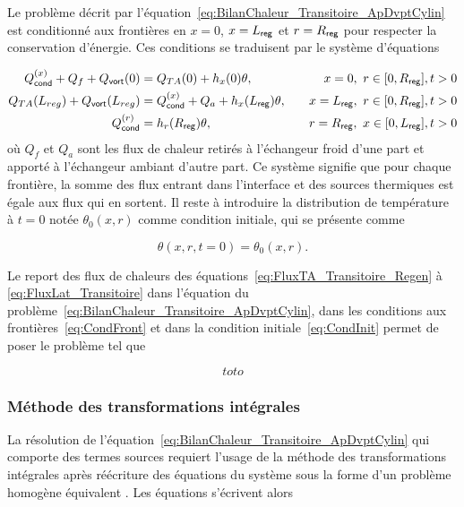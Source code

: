 Le problème décrit par l'équation~\ref{eq:BilanChaleur_Transitoire_ApDvptCylin} est conditionné aux frontières en $x=0$, $x=L_{\sf reg}$ et $r=R_{\sf reg}$ pour respecter la conservation d'énergie. Ces conditions se traduisent par le système d'équations

\begin{subequations}
	\begin{align}
		Q_{\sf cond}^{(x)} + Q_f + Q_{\sf vort}(0) &= Q_{TA}(0) + h_x(0)\theta,\quad &x=0,\ r \in [0,R_{\sf reg}], t>0 \label{eq:CondFront_x_0Froid}\\%
		Q_{TA}(L_{reg}) + Q_{\sf vort}(L_{reg})  &= Q_{\sf cond}^{(x)} + Q_a + h_x(L_{\sf reg})\theta, \quad &x=L_{\sf reg},\ r \in [0,R_{\sf reg}], t>0 \label{eq:CondFront_x_LregAmb}\\%
		Q_{\sf cond}^{(r)} &= h_r(R_{\sf reg})\theta, \quad &r=R_{\sf reg},\ x \in [0,L_{\sf reg}], t>0 \label{eq:CondFront_r_ra}
	\end{align}%
	\label{eq:CondFront}%
\end{subequations}
où $Q_f$ et $Q_a$ sont les flux de chaleur retirés à l'échangeur froid d'une part et apporté à l'échangeur ambiant d'autre part. Ce système signifie que pour chaque frontière, la somme des flux entrant dans l'interface et des sources thermiques est égale aux flux qui en sortent. Il reste à introduire la distribution de température à $t=0$ notée $\theta_0(x,r)$ comme condition initiale, qui se présente comme

\begin{equation}
	\theta(x,r,t=0) = \theta_0(x,r).
	\label{eq:CondInit}
\end{equation}

Le report des flux de chaleurs des équations~\eqref{eq:FluxTA_Transitoire_Regen} à \eqref{eq:FluxLat_Transitoire} dans l'équation du problème~\eqref{eq:BilanChaleur_Transitoire_ApDvptCylin}, dans les conditions aux frontières~\eqref{eq:CondFront} et dans la condition initiale~\eqref{eq:CondInit} permet de poser le problème tel que

\begin{equation}
	toto
	\label{eq:ProbTransitoire_ApDvpt}
\end{equation}

\subsubsection{Méthode des transformations intégrales}\label{chap:TransfoIntegrales}
La résolution de l'équation~\eqref{eq:BilanChaleur_Transitoire_ApDvptCylin} qui comporte des termes sources requiert l'usage de la méthode des transformations intégrales après réécriture des équations du système sous la forme d'un problème homogène équivalent \cite{ozisik_heat_1993}. Les équations s'écrivent alors

